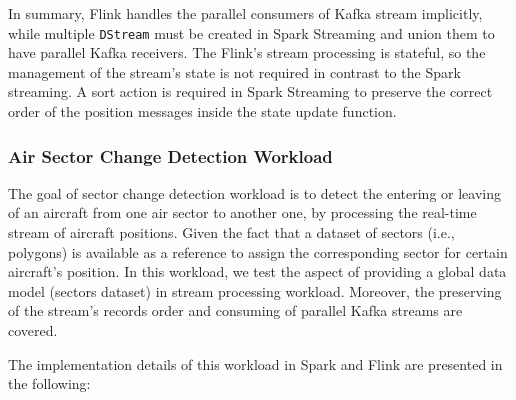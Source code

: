 \documentclass[]{article}
\begin{document}
\begin{itemize}
\end{itemize}

\par In summary, Flink  handles  the parallel consumers of Kafka stream implicitly, while multiple \texttt{DStream} must be created in Spark Streaming and union them to have parallel Kafka receivers. The Flink's stream processing is stateful, so  the  management of the stream's state is not required in contrast to the Spark streaming. A sort action is required in Spark Streaming to preserve the correct  order of the position messages inside the state update function.

\subsubsection{Air Sector Change Detection Workload}
\label{sec:sectors}
The goal of sector change detection workload is to detect the  entering or leaving of an aircraft from one air sector to another one, by processing the real-time stream of aircraft positions. Given the fact that a dataset of sectors (i.e., polygons) is available as a reference to assign the corresponding sector for certain aircraft's position. In this workload, we test the aspect of providing a global data model (sectors dataset) in stream processing workload. Moreover, the preserving of the stream's records order and consuming of parallel Kafka streams  are covered.
 
 The implementation details of this workload in Spark and Flink are presented in the following: 
 
\end{document}
